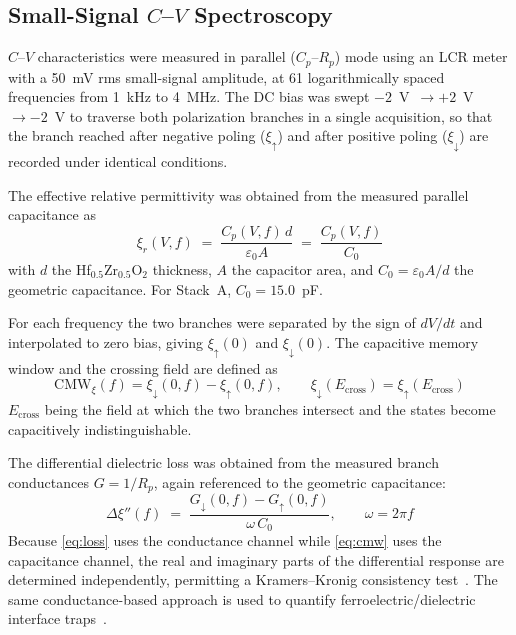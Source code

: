 \documentclass[journal]{IEEEtran}
\newcommand{\hzo}{Hf$_{0.5}$Zr$_{0.5}$O$_{2}$}
\newcommand{\xir}{\xi_{r}}
\newcommand{\CMW}{\mathrm{CMW}}
\newcommand{\Ecross}{E_{\mathrm{cross}}}
\begin{document}
\subsection{Small-Signal $C$--$V$ Spectroscopy}
$C$--$V$ characteristics were measured in parallel ($C_p$--$R_p$) mode using
an LCR meter with a 50~mV rms small-signal amplitude, at 61 logarithmically
spaced frequencies from 1~kHz to 4~MHz. The DC bias was swept
$-2$~V~$\rightarrow +2$~V~$\rightarrow -2$~V to traverse both polarization
branches in a single acquisition, so that the branch reached after negative
poling ($\xi_\uparrow$) and after positive poling ($\xi_\downarrow$) are
recorded under identical conditions.

The effective relative permittivity was obtained from the measured parallel
capacitance as
\begin{equation}
\xir(V,f) \;=\; \frac{C_p(V,f)\,d}{\varepsilon_0 A} \;=\; \frac{C_p(V,f)}{C_0}
\label{eq:eps}
\end{equation}
with $d$ the \hzo{} thickness, $A$ the capacitor area, and
$C_0 = \varepsilon_0 A/d$ the geometric capacitance. For Stack~A,
$C_0 = 15.0$~pF.

For each frequency the two branches were separated by the sign of $dV/dt$ and
interpolated to zero bias, giving $\xi_\uparrow(0)$ and $\xi_\downarrow(0)$.
The capacitive memory window and the crossing field are defined as
\begin{equation}
\CMW_\xi(f) = \xi_\downarrow(0,f) - \xi_\uparrow(0,f),
\qquad
\xi_\downarrow(\Ecross) = \xi_\uparrow(\Ecross)
\label{eq:cmw}
\end{equation}
$\Ecross$ being the field at which the two branches intersect and the states
become capacitively indistinguishable.

The differential dielectric loss was obtained from the measured branch
conductances $G = 1/R_p$, again referenced to the geometric capacitance:
\begin{equation}
\Delta\xi''(f) \;=\; \frac{G_\downarrow(0,f) - G_\uparrow(0,f)}{\omega\,C_0},
\qquad \omega = 2\pi f
\label{eq:loss}
\end{equation}
Because \eqref{eq:loss} uses the conductance channel while \eqref{eq:cmw}
uses the capacitance channel, the real and imaginary parts of the
differential response are determined independently, permitting a
Kramers--Kronig consistency test~\cite{nicollian1982,schroder2006}. The same
conductance-based approach is used to quantify ferroelectric/dielectric
interface traps~\cite{li2021traps}.
\end{document}
